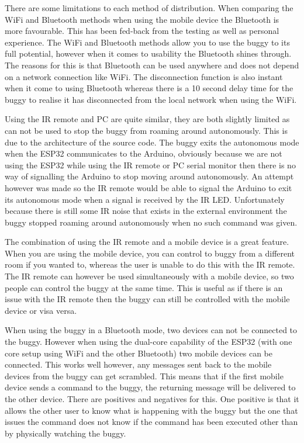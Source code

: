 \documentclass[8pt, a4paper]{article}
\begin{document}
There are some limitations to each method of distribution. When comparing the WiFi and Bluetooth methods when using the mobile device the Bluetooth is more favourable. This has been fed-back from the testing as well as personal experience. The WiFi and Bluetooth methods allow you to use the buggy to its full potential, however when it comes to usability the Bluetooth shines through. The reasons for this is that Bluetooth can be used anywhere and does not depend on a network connection like WiFi. The disconnection function is also instant when it come to using Bluetooth whereas there is a 10 second delay time for the buggy to realise it has disconnected from the local network when using the WiFi. 

Using the IR remote and PC are quite similar, they are both slightly limited as can not be used to stop the buggy from roaming around autonomously. This is due to the architecture of the source code. The buggy exits the autonomous mode when the ESP32 communicates to the Arduino, obviously because we are not using the ESP32 while using the IR remote or PC serial monitor then there is no way of signalling the Arduino to stop moving around autonomously. An attempt however was made so the IR remote would be able to signal the Arduino to exit its autonomous mode when a signal is received by the IR LED. Unfortunately because there is still some IR noise that exists in the external environment the buggy stopped roaming around autonomously when no such command was given. 

The combination of using the IR remote and a mobile device is a great feature. When you are using the mobile device, you can control to buggy from a different room if you wanted to, whereas the user is unable to do this with the IR remote. The IR remote can however be used simultaneously with a mobile device, so two people can control the buggy at the same time. This is useful as if there is an issue with the IR remote then the buggy can still be controlled with the mobile device or visa versa. 

When using the buggy in a Bluetooth mode, two devices can not be connected to the buggy. However when using the dual-core capability of the ESP32 (with one core setup using WiFi and the other Bluetooth) two mobile devices can be connected. This works well however, any messages sent back to the mobile devices from the buggy can get scrambled. This means that if the first mobile device sends a command to the buggy, the returning message will be delivered to the other device. There are positives and negatives for this. One positive is that it allows the other user to know what is happening with the buggy but the one that issues the command does not know if the command has been executed other than by physically watching the buggy. 
\end{document}
